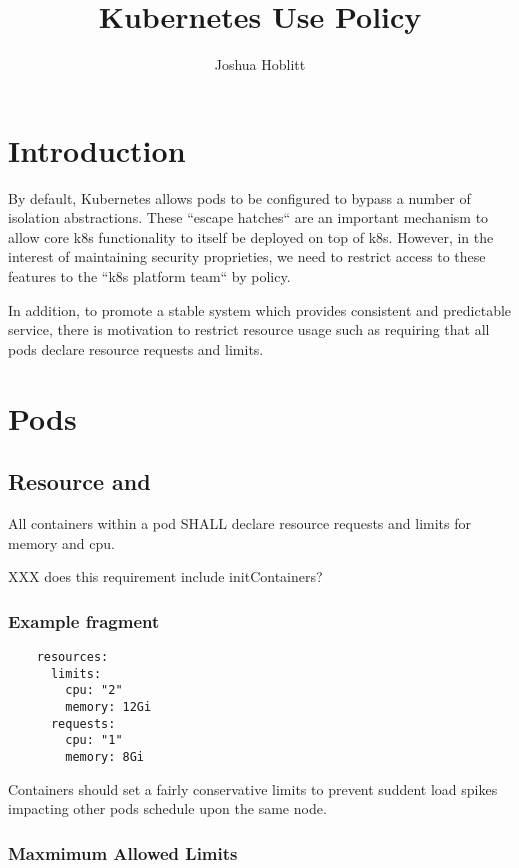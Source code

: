 \documentclass[PMO,authoryear,toc]{lsstdoc}
\title{Kubernetes Use Policy}
\author{%
Joshua Hoblitt
}
\date{\vcsDate}
\begin{document}
\maketitle

\section{Introduction}\label{sec:intro}

By default, Kubernetes allows pods to be configured to bypass a number of isolation abstractions.
These ``escape hatches`` are an important mechanism to allow core k8s functionality to itself be deployed on top of k8s.
However, in the interest of maintaining security proprieties, we need to restrict access to these features to the ``k8s platform team`` by policy.

In addition, to promote a stable system which provides consistent and predictable service, there is motivation to restrict resource usage such as requiring that all pods declare resource requests and limits.

\section{Pods}\label{sec:pod}

\subsection{Resource  and }

All containers within a pod SHALL declare resource requests and limits for memory and cpu.

XXX does this requirement include initContainers?

\subsubsection{Example  fragment}

\begin{verbatim}
    resources:
      limits:
        cpu: "2"
        memory: 12Gi
      requests:
        cpu: "1"
        memory: 8Gi
\end{verbatim}

Containers should set a fairly conservative limits to prevent suddent load spikes impacting other pods schedule upon the same node.

\subsubsection{Maxmimum Allowed Limits}
\end{document}
